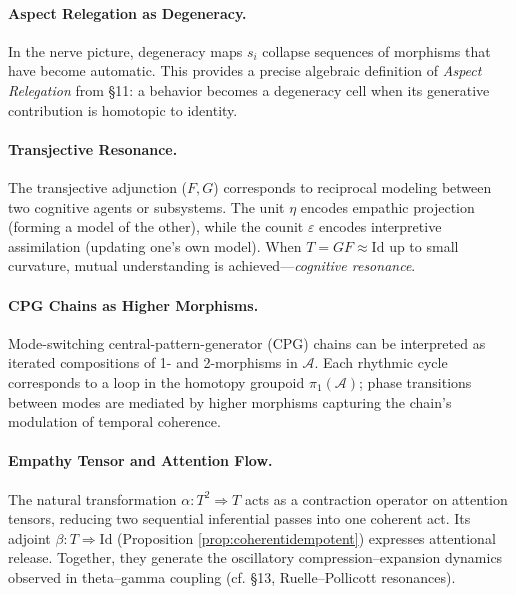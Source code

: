 \documentclass[12pt,a4paper,twoside,openright]{book}
\begin{document}
\paragraph{Aspect Relegation as Degeneracy.}
In the nerve picture, degeneracy maps \(s_i\) collapse sequences of morphisms that have become automatic.
This provides a precise algebraic definition of \emph{Aspect Relegation} from §11:
a behavior becomes a degeneracy cell when its generative contribution is homotopic to identity.

\paragraph{Transjective Resonance.}
The transjective adjunction (\(F,G\)) corresponds to reciprocal modeling between two cognitive agents or subsystems.
The unit \(\eta\) encodes empathic projection (forming a model of the other),
while the counit \(\varepsilon\) encodes interpretive assimilation (updating one’s own model).
When \(T=G\!F\approx\mathrm{Id}\) up to small curvature, mutual understanding is achieved—\emph{cognitive resonance}.

\paragraph{CPG Chains as Higher Morphisms.}
Mode-switching central-pattern-generator (CPG) chains can be interpreted as iterated compositions of 1- and 2-morphisms in \(\mathcal{A}\).
Each rhythmic cycle corresponds to a loop in the homotopy groupoid \(\pi_1(\mathcal{A})\);
phase transitions between modes are mediated by higher morphisms capturing the chain’s modulation of temporal coherence.

\paragraph{Empathy Tensor and Attention Flow.}
The natural transformation \(\alpha:T^2\!\Rightarrow T\) acts as a contraction operator on attention tensors, reducing two sequential inferential passes into one coherent act.
Its adjoint \(\beta:T\!\Rightarrow\mathrm{Id}\) (Proposition \ref{prop:coherentidempotent}) expresses attentional release.
Together, they generate the oscillatory compression–expansion dynamics observed in theta–gamma coupling (cf. §13, Ruelle–Pollicott resonances).

\end{document}
